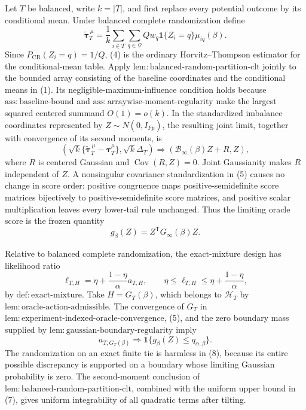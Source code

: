Let \(T\) be balanced, write \(k=|T|\), and first replace every potential outcome by its conditional mean.  Under balanced complete randomization define
\[
\widetilde{\boldsymbol\tau}^{\,\mu}_T
=\frac1k\sum_{i\in T}\sum_{q\in\mathcal Q}
Qw_q\mathbf 1\{Z_i=q\}\mu_{iq}(\beta).
\tag{4}
\]
Since \(P_{\mathrm{CR}}(Z_i=q)=1/Q\), (4) is the ordinary Horvitz--Thompson estimator for the conditional-mean table.  Apply \(\mathrm{lem{:}balanced\text{-}random\text{-}partition\text{-}clt}\) jointly to the bounded array consisting of the baseline coordinates and the conditional means in (1).  Its negligible-maximum-influence condition holds because \(\mathrm{ass{:}baseline\text{-}bound}\) and \(\mathrm{ass{:}arraywise\text{-}moment\text{-}regularity}\) make the largest squared centered summand \(O(1)=o(k)\).  In the standardized imbalance coordinates represented by \(Z\sim N(0,I_{Fp})\), the resulting joint limit, together with convergence of its second moments, is
\[
\left(
\sqrt{k}\{\widetilde{\boldsymbol\tau}^{\,\mu}_T
-\boldsymbol\tau_T^\mu\},
\sqrt{k}\Delta_T
\right)
\Rightarrow
\left(\mathcal B_\infty(\beta)Z+R,Z\right),
\tag{5}
\]
where \(R\) is centered Gaussian and \(\operatorname{Cov}(R,Z)=0\).  Joint Gaussianity makes \(R\) independent of \(Z\).  A nonsingular covariance standardization in (5) causes no change in score order: positive congruence maps positive-semidefinite score matrices bijectively to positive-semidefinite score matrices, and positive scalar multiplication leaves every lower-tail rule unchanged.  Thus the limiting oracle score is the frozen quantity
\[
g_\beta(Z)=Z^{\mathsf T}G_\infty(\beta)Z.
\tag{6}
\]

Relative to balanced complete randomization, the exact-mixture design has likelihood ratio
\[
\ell_{T,H}
=\eta+\frac{1-\eta}{\alpha}a_{T,H},
\qquad
\eta\leq\ell_{T,H}\leq
\eta+\frac{1-\eta}{\alpha},
\tag{7}
\]
by \(\mathrm{def{:}exact\text{-}mixture}\).  Take \(H=G_T(\beta)\), which belongs to \(\mathcal H_T\) by \(\mathrm{lem{:}oracle\text{-}action\text{-}admissible}\).  The convergence of \(G_T\) in \(\mathrm{lem{:}experiment\text{-}indexed\text{-}oracle\text{-}convergence}\), (5), and the zero boundary mass supplied by \(\mathrm{lem{:}gaussian\text{-}boundary\text{-}regularity}\) imply
\[
a_{T,G_T(\beta)}
\Rightarrow
\mathbf 1\{g_\beta(Z)\leq q_{\alpha,\beta}\}.
\tag{8}
\]
The randomization on an exact finite tie is harmless in (8), because its entire possible discrepancy is supported on a boundary whose limiting Gaussian probability is zero.  The second-moment conclusion of \(\mathrm{lem{:}balanced\text{-}random\text{-}partition\text{-}clt}\), combined with the uniform upper bound in (7), gives uniform integrability of all quadratic terms after tilting.

